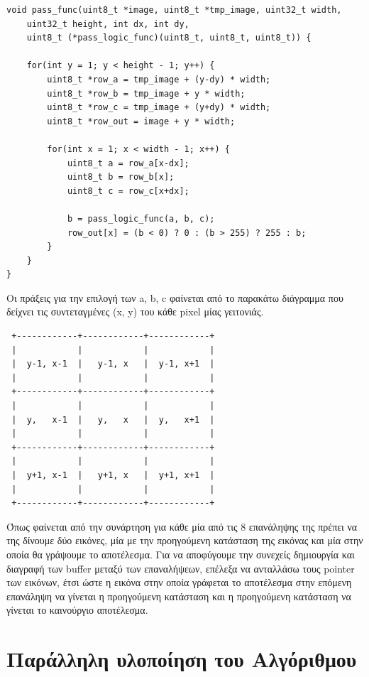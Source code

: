 \documentclass[12pt]{article}
\begin{document}
\newpage

\begin{verbatim}
void pass_func(uint8_t *image, uint8_t *tmp_image, uint32_t width,
    uint32_t height, int dx, int dy,
    uint8_t (*pass_logic_func)(uint8_t, uint8_t, uint8_t)) {

    for(int y = 1; y < height - 1; y++) {
        uint8_t *row_a = tmp_image + (y-dy) * width;
        uint8_t *row_b = tmp_image + y * width;
        uint8_t *row_c = tmp_image + (y+dy) * width;
        uint8_t *row_out = image + y * width;

        for(int x = 1; x < width - 1; x++) {
            uint8_t a = row_a[x-dx];
            uint8_t b = row_b[x];
            uint8_t c = row_c[x+dx];

            b = pass_logic_func(a, b, c);
            row_out[x] = (b < 0) ? 0 : (b > 255) ? 255 : b;
        }
    }
}
\end{verbatim}

Οι πράξεις για την επιλογή των a, b, c φαίνεται από το παρακάτω διάγραμμα που δείχνει τις συντεταγμένες (x, y) του κάθε pixel μίας γειτονιάς.

\vspace{0.3em}
\begin{center}
\begin{varwidth}{0.6\linewidth}
\begin{verbatim}
 +------------+------------+------------+ 
 |            |            |            | 
 |  y-1, x-1  |   y-1, x   |  y-1, x+1  | 
 |            |            |            | 
 +------------+------------+------------+ 
 |            |            |            | 
 |  y,   x-1  |   y,   x   |  y,   x+1  | 
 |            |            |            | 
 +------------+------------+------------+ 
 |            |            |            | 
 |  y+1, x-1  |   y+1, x   |  y+1, x+1  | 
 |            |            |            | 
 +------------+------------+------------+ 
\end{verbatim}
\end{varwidth}
\end{center}

Όπως φαίνεται από την συνάρτηση για κάθε μία από τις 8 επανάληψης της πρέπει να της δίνουμε δύο εικόνες, μία με την προηγούμενη κατάσταση της εικόνας και μία στην οποία θα γράψουμε το αποτέλεσμα. Για να αποφύγουμε την συνεχείς δημιουργία και διαγραφή των buffer μεταξύ των επαναλήψεων, επέλεξα να ανταλλάσω τους pointer των εικόνων, έτσι ώστε η εικόνα στην οποία γράφεται το αποτέλεσμα στην επόμενη επανάληψη να γίνεται η προηγούμενη κατάσταση και η προηγούμενη κατάσταση να γίνεται το καινούργιο αποτέλεσμα.

\newpage

\section{Παράλληλη υλοποίηση του Αλγόριθμου}
\vspace{1em}
\end{document}

